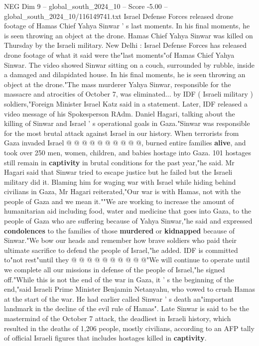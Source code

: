 \begin{textsample}{NEG Dim 9 – global\_south\_2024\_10 – Score -5.00 – global\_south\_2024\_10/116149741.txt}  \label{ex:f9_neg_278}
Israel Defense Forces released drone footage of Hamas Chief Yahya Sinwar ' s last moments.
In his final moments, he is seen throwing an object at the drone.
Hamas Chief Yahya Sinwar was killed on Thursday by the Israeli military.
New Delhi : Israel Defense Forces has released drone footage of what it said were the"last moments"of Hamas Chief Yahya Sinwar.
The video showed Sinwar sitting on a couch, surrounded by rubble, inside a damaged and dilapidated house.
In his final moments, he is seen throwing an object at the drone."The mass murderer Yahya Sinwar, responsible for the massacre and atrocities of October 7, was eliminated... by IDF ( Israeli military ) soldiers,"Foreign Minister Israel Katz said in a statement.
Later, IDF released a video message of his Spokesperson RAdm.
Daniel Hagari, talking about the killing of Sinwar and Israel ' s operational goals in Gaza."Sinwar was responsible for the most brutal attack against Israel in our history.
When terrorists from Gaza invaded Israel @ @ @ @ @ @ @ @ @ @, burned entire families \textbf{alive}, and took over 250 men, women, children, and babies hostage into Gaza. 101 hostages still remain in \textbf{captivity} in brutal conditions for the past year,"he said.
Mr Hagari said that Sinwar tried to escape justice but he failed but the Israeli military did it.
Blaming him for waging war with Israel while hiding behind civilians in Gaza, Mr Hagari reiterated,"Our war is with Hamas, not with the people of Gaza and we mean it.""We are working to increase the amount of humanitarian aid including food, water and medicine that goes into Gaza, to the people of Gaza who are suffering because of Yahya Sinwar,"he said and expressed \textbf{condolences} to the families of those \textbf{murdered} or \textbf{kidnapped} because of Sinwar."We bow our heads and remember how brave soldiers who paid their ultimate sacrifice to defend the people of Israel,"he added.
IDF is committed to"not rest"until they @ @ @ @ @ @ @ @ @ @"We will continue to operate until we complete all our missions in defense of the people of Israel,"he signed off."While this is not the end of the war in Gaza, it ' s the beginning of the end,"said Israeli Prime Minister Benjamin Netanyahu, who vowed to crush Hamas at the start of the war.
He had earlier called Sinwar ' s death an"important landmark in the decline of the evil rule of Hamas".
Late Sinwar is said to be the mastermind of the October 7 attack, the deadliest in Israeli history, which resulted in the deaths of 1,206 people, mostly civilians, according to an AFP tally of official Israeli figures that includes hostages killed in \textbf{captivity}.

\end{textsample}
